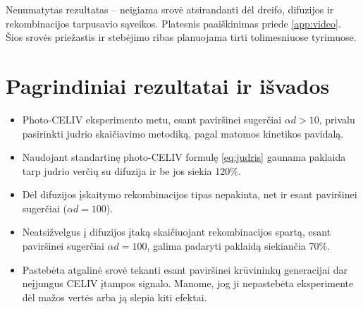 Nenumatytas rezultatas -- neigiama srovė atsirandanti dėl dreifo, difuzijos ir rekombinacijos tarpusavio sąveikos. Platesnis paaiškinimas priede \ref{app:video}. Šios srovės priežastis ir stebėjimo ribas planuojama tirti tolimesniuose tyrimuose.

\pagebreak
\section{Pagrindiniai rezultatai ir išvados}

\begin{itemize}

\item Photo-CELIV eksperimento metu, esant paviršinei sugerčiai \(\alpha d > 10\), privalu pasirinkti judrio skaičiavimo metodiką, pagal matomos kinetikos pavidalą.

\item Naudojant standartinę photo-CELIV formulę \eqref{eq:judris} gaunama paklaida tarp judrio verčių su difuzija ir be jos siekia 120\%.

\item Dėl difuzijos įskaitymo rekombinacijos tipas nepakinta, net ir esant paviršinei sugerčiai (\(\alpha d = 100\)).

\item Neatsižvelgus į difuzijos įtaką skaičiuojant rekombinacijos spartą, esant paviršinei sugerčiai \(\alpha d = 100\), galima padaryti paklaidą siekiančia 70\%.

\item Pastebėta atgalinė srovė tekanti esant paviršinei krūvininkų generacijai dar neįjungus CELIV įtampos signalo. Manome, jog ji nepastebėta eksperimente dėl mažos vertės arba ją slepia kiti efektai.

\end{itemize}


\pagebreak